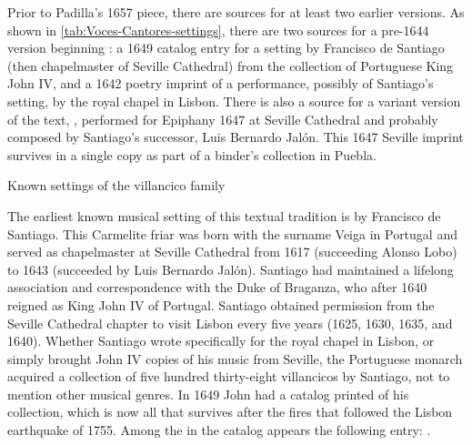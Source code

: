 Prior to Padilla's 1657 piece, there are sources for at least two earlier
versions. 
As shown in \cref{tab:Voces-Cantores-settings}, there are two sources for a
pre-1644 version beginning : a 1649 catalog
entry for a setting by Francisco de Santiago (then chapelmaster of Seville
Cathedral) from the collection of Portuguese King John IV, and a 1642 poetry
imprint of a performance, possibly of Santiago's setting, by the royal chapel in
Lisbon.
There is also a source for a variant version of the text, , performed for Epiphany 1647 at Seville Cathedral and probably composed
by Santiago's successor, Luis Bernardo Jalón.
This 1647 Seville imprint survives in a single copy as part of a binder's
collection in Puebla.

\begin{table}
    \caption{Known settings of the  villancico
    family}

    \label{tab:Voces-Cantores-settings}

\end{table}

The earliest known musical setting of this textual tradition is by Francisco de
Santiago.
This Carmelite friar was born with the surname Veiga in Portugal and served as
chapelmaster at Seville Cathedral from 1617 (succeeding Alonso Lobo) to 1643
(succeeded by Luis Bernardo Jalón).%
    \Autocites{Stevenson:SantiagoF}{Perez:DMEH-Santiago} 
Santiago had maintained a lifelong association and correspondence with the Duke
of Braganza, who after 1640 reigned as King John IV of Portugal.
Santiago obtained permission from the Seville Cathedral chapter to visit Lisbon
every five years (1625, 1630, 1635, and 1640).
Whether Santiago wrote specifically for the royal chapel in Lisbon, or simply
brought John IV copies of his music from Seville, the Portuguese monarch
acquired a collection of five hundred thirty-eight villancicos by Santiago, not
to mention other musical genres.
In 1649 John had a catalog printed of his collection, which is now all that
survives after the fires that followed the Lisbon earthquake of 1755.
Among the  in the
catalog appears the following entry:
.%
    \Autocites
    [caixão 26, ]{JohnIV:Catalog}
    [see also][]{Ribeiro:JohnIV}

